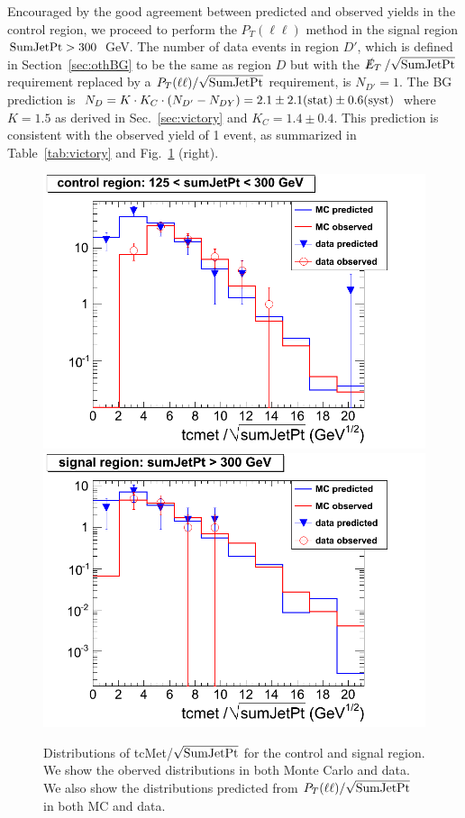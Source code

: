 Encouraged by the good agreement between predicted and observed yields
in the control region, we proceed to perform the $P_T(\ell \ell)$ method 
in the signal region ${\rm SumJetPt}>300$~GeV.
The number of data events in region $D'$, which is defined in 
Section~\ref{sec:othBG} to be the same as region $D$ but with the
$\met/\sqrt{\rm SumJetPt}$ requirement 
replaced by a $P_T(\ell\ell)/\sqrt{\rm SumJetPt}$ requirement,
is $N_{D'}=1$.  
The BG prediction is 
$N_D = K \cdot K_C \cdot (N_{D'}-N_{DY}) = 2.1 \pm 2.1({\rm stat}) \pm 0.6({\rm syst})$ 
where $K=1.5$ as derived in Sec.~\ref{sec:victory} and $K_C = 1.4 \pm 0.4$.
This prediction is consistent with the observed yield of 1 event, as summarized 
in Table~\ref{tab:victory} and Fig.~\ref{fig:victory} (right).


\begin{figure}[hbt]
\begin{center}
\includegraphics[width=0.48\linewidth]{victory_control_jsonv3.png}
\includegraphics[width=0.48\linewidth]{victory_signal_jsonv3.png}
\caption{\label{fig:victory}\protect Distributions of 
tcMet/$\sqrt{\rm SumJetPt}$ for the control and signal region.
We show the oberved distributions in both Monte Carlo and data.
We also show the distributions predicted from 
${P_T(\ell\ell)}/\sqrt{\rm SumJetPt}$ in both MC and data.}
\end{center}
\end{figure}


